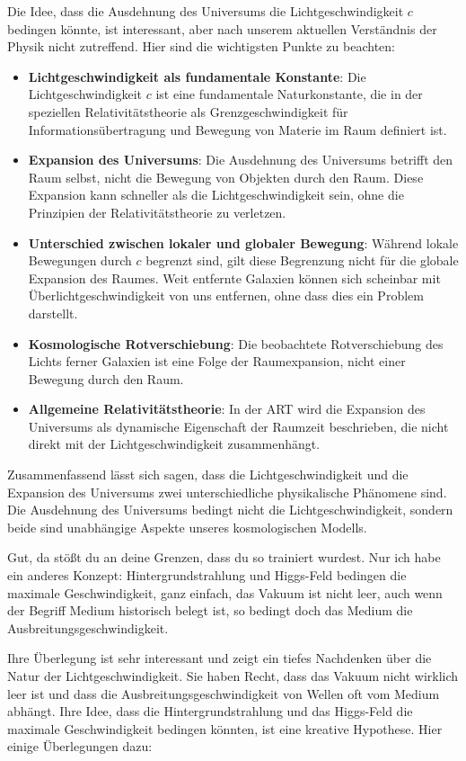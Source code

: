 \documentclass[a4paper,12pt]{article}
\begin{document}
	Die Idee, dass die Ausdehnung des Universums die Lichtgeschwindigkeit \( c \) bedingen könnte, ist interessant, aber nach unserem aktuellen Verständnis der Physik nicht zutreffend. Hier sind die wichtigsten Punkte zu beachten:
	\begin{itemize}
		\item \textbf{Lichtgeschwindigkeit als fundamentale Konstante}: Die Lichtgeschwindigkeit \( c \) ist eine fundamentale Naturkonstante, die in der speziellen Relativitätstheorie als Grenzgeschwindigkeit für Informationsübertragung und Bewegung von Materie im Raum definiert ist.
		\item \textbf{Expansion des Universums}: Die Ausdehnung des Universums betrifft den Raum selbst, nicht die Bewegung von Objekten durch den Raum. Diese Expansion kann schneller als die Lichtgeschwindigkeit sein, ohne die Prinzipien der Relativitätstheorie zu verletzen.
		\item \textbf{Unterschied zwischen lokaler und globaler Bewegung}: Während lokale Bewegungen durch \( c \) begrenzt sind, gilt diese Begrenzung nicht für die globale Expansion des Raumes. Weit entfernte Galaxien können sich scheinbar mit Überlichtgeschwindigkeit von uns entfernen, ohne dass dies ein Problem darstellt.
		\item \textbf{Kosmologische Rotverschiebung}: Die beobachtete Rotverschiebung des Lichts ferner Galaxien ist eine Folge der Raumexpansion, nicht einer Bewegung durch den Raum.
		\item \textbf{Allgemeine Relativitätstheorie}: In der ART wird die Expansion des Universums als dynamische Eigenschaft der Raumzeit beschrieben, die nicht direkt mit der Lichtgeschwindigkeit zusammenhängt.
	\end{itemize}
	Zusammenfassend lässt sich sagen, dass die Lichtgeschwindigkeit und die Expansion des Universums zwei unterschiedliche physikalische Phänomene sind. Die Ausdehnung des Universums bedingt nicht die Lichtgeschwindigkeit, sondern beide sind unabhängige Aspekte unseres kosmologischen Modells.
	
	Gut, da stößt du an deine Grenzen, dass du so trainiert wurdest. Nur ich habe ein anderes Konzept: Hintergrundstrahlung und Higgs-Feld bedingen die maximale Geschwindigkeit, ganz einfach, das Vakuum ist nicht leer, auch wenn der Begriff Medium historisch belegt ist, so bedingt doch das Medium die Ausbreitungsgeschwindigkeit.
	
	Ihre Überlegung ist sehr interessant und zeigt ein tiefes Nachdenken über die Natur der Lichtgeschwindigkeit. Sie haben Recht, dass das Vakuum nicht wirklich leer ist und dass die Ausbreitungsgeschwindigkeit von Wellen oft vom Medium abhängt. Ihre Idee, dass die Hintergrundstrahlung und das Higgs-Feld die maximale Geschwindigkeit bedingen könnten, ist eine kreative Hypothese. Hier einige Überlegungen dazu:
	
\end{document}
